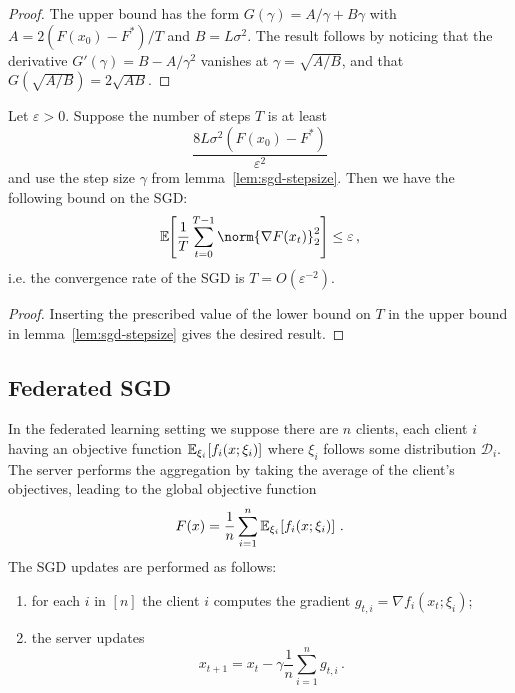 \documentclass{article}
\begin{document}
\begin{proof}
  The upper bound has the form $G(\gamma) = A/\gamma + B\gamma$ with $A = 2(F(x_0) - F^\ast) / T$ and $B = L \sigma^2$. The result follows by noticing that the derivative $G'(\gamma) = B - A/\gamma^2$ vanishes at $\gamma = \sqrt{A/B}$, and that $G(\sqrt{A/B}) = 2\sqrt{AB}$.
\end{proof}



\begin{lemma}\label{lem:sgd-convergence-rate}
  Let $\varepsilon > 0$. Suppose the number of steps $T$ is at least
  \[
    \frac{8 L \sigma^2 (F(x_0) - F^\ast)}{\varepsilon^2}
  \]
  and use the step size $\gamma$ from lemma~\ref{lem:sgd-stepsize}.
  Then we have the following bound on the SGD:
  \[
    \expec{ \frac{1}{T} \sum_{t=0}^{T-1} \norm{\nabla F(x_t)}_2^2 }
    \leq
    \varepsilon
    \, ,
  \]
  i.e. the convergence rate of the SGD is $T = O(\varepsilon^{-2})$.

\end{lemma}


\begin{proof}
  Inserting the prescribed value of the lower bound on $T$ in the upper bound in lemma~\ref{lem:sgd-stepsize} gives the desired result.
\end{proof}


\subsection{Federated SGD}


In the federated learning setting we suppose there are $n$ clients, each client $i$ having an objective function $\expec[\xi_i]{f_i(x; \xi_i)}$ where $\xi_i$ follows some distribution $\mathcal D_i$. The server performs the aggregation by taking the average of the client's objectives, leading to the global objective function
\[
  F(x) = \frac{1}{n} \sum_{i=1}^n \expec[\xi_i]{f_i(x; \xi_i)}
  \, .
\]
The SGD updates are performed as follows:
\begin{enumerate}
  \item for each $i$ in $[n]$ the client $i$ computes the gradient $g_{t,i} = \nabla f_i(x_t; \xi_i)$;

  \item the server updates
        \[
          x_{t+1} = x_t - \gamma \frac{1}{n} \sum_{i=1}^n g_{t,i}
          \, .
        \]
\end{enumerate}
\end{document}
